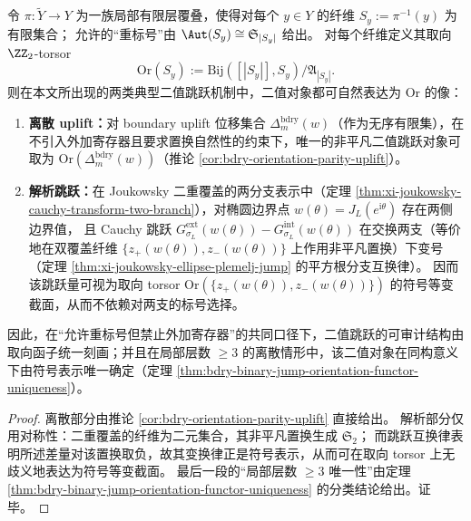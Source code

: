 \begin{theorem}\label{thm:xi-binary-jump-orientation-unification}
令 \(\pi:\widetilde Y\to Y\) 为一族局部有限层覆叠，使得对每个 \(y\in Y\) 的纤维 \(S_y:=\pi^{-1}(y)\) 为有限集合；
允许的“重标号”由 \(\Aut(S_y)\cong \mathfrak S_{|S_y|}\) 给出。
对每个纤维定义其取向 \(\ZZ_2\)-torsor
\[
\mathrm{Or}(S_y):=\mathrm{Bij}([|S_y|],S_y)\big/\mathfrak A_{|S_y|}.
\]
则在本文所出现的两类典型二值跳跃机制中，二值对象都可自然表达为 \(\mathrm{Or}\) 的像：
\begin{enumerate}
\normalfont
  \item \textbf{离散 uplift：}对 boundary uplift 位移集合 \(\Delta_m^{\mathrm{bdry}}(w)\)（作为无序有限集），在不引入外加寄存器且要求置换自然性的约束下，唯一的非平凡二值跳跃对象可取为
  \(\mathrm{Or}(\Delta_m^{\mathrm{bdry}}(w))\)（推论 \ref{cor:bdry-orientation-parity-uplift}）。
  \item \textbf{解析跳跃：}在 Joukowsky 二重覆盖的两分支表示中（定理 \ref{thm:xi-joukowsky-cauchy-transform-two-branch}），对椭圆边界点 \(w(\theta)=J_L(e^{\mathrm{i}\theta})\) 存在两侧边界值，
  且 Cauchy 跳跃
  \(
  G_{\sigma_L}^{\mathrm{ext}}(w(\theta))-G_{\sigma_L}^{\mathrm{int}}(w(\theta))
  \)
  在交换两支（等价地在双覆盖纤维 \(\{z_+(w(\theta)),z_-(w(\theta))\}\) 上作用非平凡置换）下变号（定理 \ref{thm:xi-joukowsky-ellipse-plemelj-jump} 的平方根分支互换律）。
  因而该跳跃量可视为取向 torsor \(\mathrm{Or}(\{z_+(w(\theta)),z_-(w(\theta))\})\) 的符号等变截面，从而不依赖对两支的标号选择。
\end{enumerate}
因此，在“允许重标号但禁止外加寄存器”的共同口径下，二值跳跃的可审计结构由取向函子统一刻画；并且在局部层数 \(\ge 3\) 的离散情形中，该二值对象在同构意义下由符号表示唯一确定（定理 \ref{thm:bdry-binary-jump-orientation-functor-uniqueness}）。
\end{theorem}

\begin{proof}
离散部分由推论 \ref{cor:bdry-orientation-parity-uplift} 直接给出。
解析部分仅用对称性：二重覆盖的纤维为二元集合，其非平凡置换生成 \(\mathfrak S_2\)；
而跳跃互换律表明所述差量对该置换取负，故其变换律正是符号表示，从而可在取向 torsor 上无歧义地表达为符号等变截面。
最后一段的“局部层数 \(\ge 3\) 唯一性”由定理 \ref{thm:bdry-binary-jump-orientation-functor-uniqueness} 的分类结论给出。证毕。
\end{proof}

